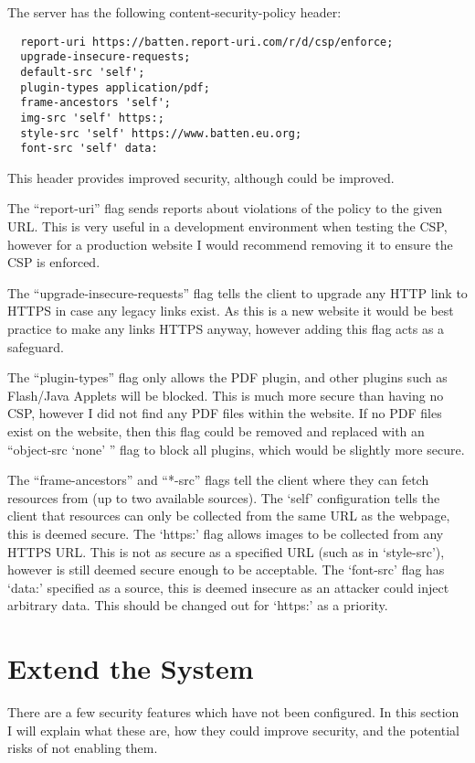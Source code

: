 \documentclass[12pt]{article}
\begin{document}
  The server has the following content-security-policy header:
  \begin{verbatim}
  report-uri https://batten.report-uri.com/r/d/csp/enforce; 
  upgrade-insecure-requests; 
  default-src 'self'; 
  plugin-types application/pdf; 
  frame-ancestors 'self'; 
  img-src 'self' https:; 
  style-src 'self' https://www.batten.eu.org; 
  font-src 'self' data:
  \end{verbatim}

  This header provides improved security, although could be improved.

  The ``report-uri'' flag sends reports about violations of the policy to the given URL.
  This is very useful in a development environment when testing the CSP, however for a production website I would recommend removing it to ensure the CSP is enforced.

  The ``upgrade-insecure-requests'' flag tells the client to upgrade any HTTP link to HTTPS in case any legacy links exist.
  As this is a new website it would be best practice to make any links HTTPS anyway, however adding this flag acts as a safeguard.

  The ``plugin-types'' flag only allows the PDF plugin, and other plugins such as Flash/Java Applets will be blocked.
  This is much more secure than having no CSP, however I did not find any PDF files within the website.
  If no PDF files exist on the website, then this flag could be removed and replaced with an ``object-src `none' '' flag to block all plugins, which would be slightly more secure.

  The ``frame-ancestors'' and ``*-src'' flags tell the client where they can fetch resources from (up to two available sources).
  The `self' configuration tells the client that resources can only be collected from the same URL as the webpage, this is deemed secure.
  The `https:' flag allows images to be collected from any HTTPS URL.
  This is not as secure as a specified URL (such as in `style-src'), however is still deemed secure enough to be acceptable.
  The `font-src' flag has `data:' specified as a source, this is deemed insecure as an attacker could inject arbitrary data.
  This should be changed out for `https:' as a priority.

  \section{Extend the System}

  There are a few security features which have not been configured.
  In this section I will explain what these are, how they could improve security, and the potential risks of not enabling them.
\end{document}
